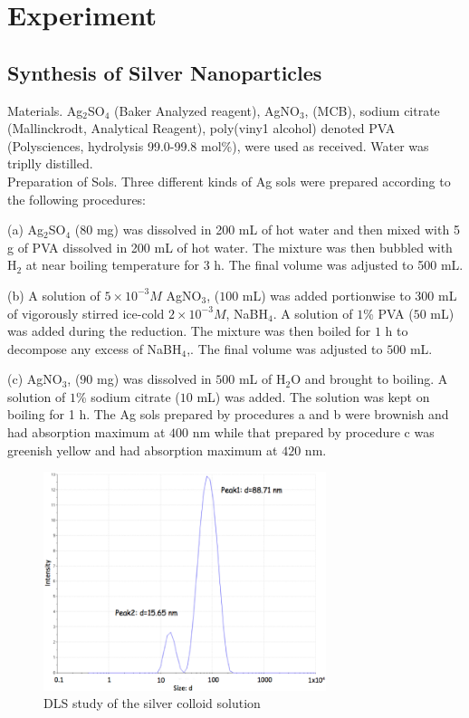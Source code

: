 \documentclass[twocolumn,showpacs,preprintnumbers,amsmath,amssymb]{revtex4}
\begin{document}
\section{Experiment}
\subsection{Synthesis of Silver Nanoparticles}
Materials. Ag$_2$SO$_4$ (Baker Analyzed reagent), AgNO$_3$,
(MCB), sodium citrate (Mallinckrodt, Analytical Reagent),
poly(viny1 alcohol) denoted PVA (Polysciences, hydrolysis
99.0-99.8  mol\%), were used as received.
Water was triplly distilled.
\\
Preparation of Sols. Three different kinds of Ag sols
were prepared  according to the following procedures:

(a) Ag$_2$SO$_4$ (80 mg) was dissolved in 200 mL of hot
water and then mixed with 5 g of PVA dissolved in 200
mL of hot water.  The mixture was then bubbled with H$_2$
at near boiling temperature for $3$ h.  The final volume was
adjusted to 500 mL.

(b) A solution of  $5 \times 10^{-3} M $ AgNO$_3$,  ($100$ mL) was added
portionwise to 300 mL of vigorously stirred ice-cold  $2 \times
10^{-3} M$, NaBH$_4$. A solution of  $1$\% PVA ($50$ mL) was added
during the reduction.  The mixture was then boiled for $1$ h to
decompose any excess of NaBH$_4$,.  The final volume
was adjusted to $500$ mL.

(c) AgNO$_3$,  ($90$ mg) was dissolved in $500$ mL of  H$_2$O and
brought to boiling.  A solution of  $1$\% sodium citrate ($10$
mL) was added.  The solution was kept on boiling for 1 h.
The Ag  sols  prepared  by  procedures  a  and  b  were
brownish and had absorption maximum at $400$ nm while
that prepared by procedure c was greenish yellow and had
absorption maximum at $420$ nm.

\begin{figure}[!h]
  \includegraphics[width=3.25in]{DLS.png}
  \caption{DLS study of the silver colloid solution}
  \label{fig:setup}
\end{figure}
\end{document}
